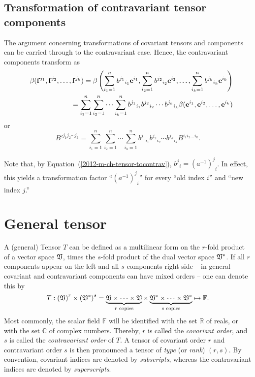 \subsection{Transformation of contravariant tensor components}

The argument concerning transformations of covariant tensors and components
can be carried through to the contravariant case.
Hence, the contravariant components transform as
\begin{eqnarray}
&&\beta ( {{\bf f}}^{j_1},{{\bf f}}^{j_2},\ldots ,{{\bf f}}^{j_k})=
\beta \left(
\sum_{i_1=1}^n {b^{j_1}}_{i_1} {\bf e}^{i_1},
\sum_{i_2=1}^n {b^{j_2}}_{i_2} {\bf e}^{i_2},
\ldots ,
\sum_{i_k=1}^n {b^{j_k}}_{i_k} {\bf e}^{i_k}
\right)
\nonumber \\&& \quad
=
\sum_{i_1=1}^n\sum_{i_2=1}^n\cdots \sum_{i_k=1}^n
{b^{j_1}}_{i_1}{b^{j_2}}_{i_2}\cdots {b^{j_k}}_{i_k} \beta ( {\bf e}^{i_1},{\bf e}^{i_2},\ldots ,{\bf e}^{i_k})
 \label{2012-m-ch-tensor-etotccon1}
\end{eqnarray}
or
\begin{equation}
B'^{{j_1}{j_2}\cdots {j_k}}=
\sum_{i_1=1}^n\sum_{i_2=1}^n\cdots \sum_{i_k=1}^n
{b^{j_1}}_{i_1}{b^{j_2}}_{i_2}\cdots {b^{j_k}}_{i_k} B^{i_1 i_2\ldots i_k}.
 \label{2012-m-ch-tensor-etotccon2}
\end{equation}

Note that, by Equation~(\ref{2012-m-ch-tensor-tocontrav}),
$ {b^j}_i =  {\left( a^{-1} \right)^j}_i$.
%
In effect, this yields a transformation factor ``${\left( a^{-1} \right)^j}_i$'' for every ``old index $i$'' and ``new index $j$.''


\section{General tensor}

A (general) Tensor $T$ can be defined as a multilinear form  on the
$r$-fold product of a vector space ${\frak V}$, times the
$s$-fold product of the dual vector space ${\frak V}^\ast$.
If all $r$ components appear on the left and all $s$ components right side
-- in general covariant and contravariant components can have mixed orders --
one can denote this by
\begin{equation}
T: \left( {\frak V} \right)^r \times \left( {\frak V}^\ast \right)^s
=
\underbrace{{\frak V}\times \cdots \times {\frak V}}_{r\textrm{ \scriptsize copies}}
\times
\underbrace{{\frak V}^\ast \times \cdots \times {\frak V}^\ast}_{s\textrm{ \scriptsize copies}}
\mapsto \mathbb{F}
.
 \label{2012-m-ch-tensor-gdt}
\end{equation}
Most commonly, the scalar field
$\mathbb{F}$
will be identified with the set $\mathbb{R}$ of reals,
or with the set $\mathbb{C}$ of complex numbers.
Thereby,
$r$ is called the
{\em covariant order}, and
$s$ is called the
{\em contravariant order}
of $T$.
A tensor of covariant order $r$ and contravariant order $s$
is then pronounced a tensor of
{\em type} (or {\em rank})
$(r,s)$.
By convention, covariant indices are denoted by {\em subscripts},
whereas the contravariant indices are denoted by {\em superscripts}.

